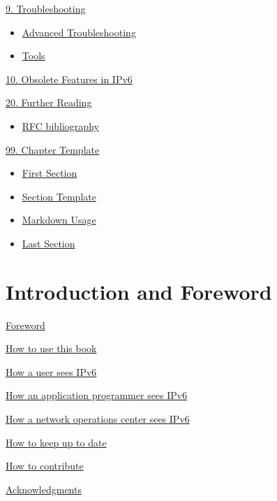 \documentclass[
]{article}
\providecommand{\tightlist}{%
  \setlength{\itemsep}{0pt}\setlength{\parskip}{0pt}}
\begin{document}
\hyperref[troubleshooting]{9. Troubleshooting}

\begin{itemize}
\tightlist
\item
  \hyperref[advanced-troubleshooting]{Advanced Troubleshooting}
\item
  \hyperref[tools]{Tools}
\end{itemize}

\hyperref[obsolete-features-in-ipv6]{10. Obsolete Features in IPv6}

\hyperref[further-reading]{20. Further Reading}

\begin{itemize}
\tightlist
\item
  \hyperref[rfc-bibliography]{RFC bibliography}
\end{itemize}

\hyperref[chapter-template]{99. Chapter Template}

\begin{itemize}
\tightlist
\item
  \hyperref[first-section]{First Section}
\item
  \hyperref[section-template]{Section Template}
\item
  \hyperref[markdown-usage]{Markdown Usage}
\item
  \hyperref[last-section]{Last Section}
\end{itemize}

\pagebreak

\section{Introduction and Foreword}\label{introduction-and-foreword}

\hyperref[foreword]{Foreword}

\hyperref[how-to-use-this-book]{How to use this book}

\hyperref[how-a-user-sees-ipv6]{How a user sees IPv6}

\hyperref[how-an-application-programmer-sees-ipv6]{How an application
programmer sees IPv6}

\hyperref[how-a-network-operations-center-sees-ipv6]{How a network
operations center sees IPv6}

\hyperref[how-to-keep-up-to-date]{How to keep up to date}

\hyperref[how-to-contribute]{How to contribute}

\hyperref[acknowledgments]{Acknowledgments}
\end{document}
